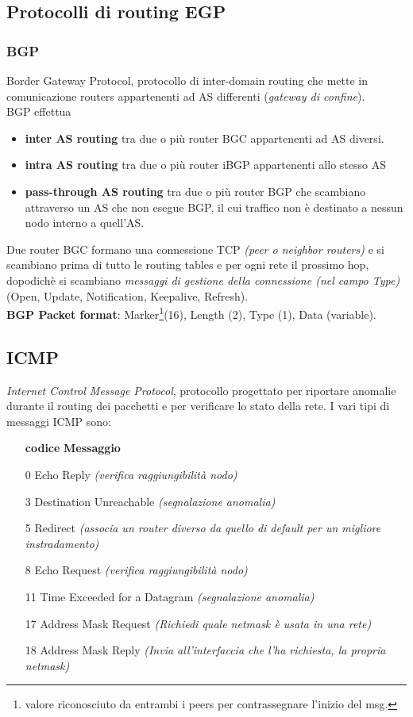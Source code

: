 \documentclass[a4paper,11pt]{article}
\begin{document}
\subsection{Protocolli di routing EGP}
\subsubsection{BGP}
Border Gateway Protocol, protocollo di inter-domain routing che mette in comunicazione routers appartenenti ad AS differenti (\textit{gateway di confine}).\\
BGP effettua 
\begin{itemize}
\item\textbf{inter AS routing} tra due o più router BGC appartenenti ad AS diversi. 
\item\textbf{intra AS routing} tra due o più router iBGP appartenenti allo stesso AS
\item\textbf{pass-through AS routing} tra due o più router BGP che scambiano attraverso un AS che non esegue BGP, il cui traffico non è destinato a nessun nodo interno a quell'AS.
\end{itemize}
Due router BGC formano una connessione TCP \textit{(peer o neighbor routers)} e si scambiano prima di tutto le routing tables e per ogni rete il prossimo hop, dopodichè si scambiano \textit{messaggi di gestione della connessione (nel campo Type)} (Open, Update, Notification, Keepalive, Refresh).\\
\textbf{BGP Packet format}: Marker\footnote{valore riconosciuto da entrambi i peers per contrassegnare l'inizio del msg.}(16), Length (2), Type (1), Data (variable).                                                                                                                  
                                                                                                                  
\subsection{ICMP}
\textit{Internet Control Message Protocol}, protocollo progettato per riportare anomalie durante il routing dei pacchetti e per verificare lo stato della rete. I vari tipi di messaggi ICMP sono:
\begin{itemize}
\item[\textbf{codice}] \textbf{Messaggio}
\item[0] Echo Reply \textit{(verifica raggiungibilità nodo)}
\item[3] Destination Unreachable \textit{(segnalazione anomalia)}
\item[5] Redirect \textit{(associa un router diverso da quello di default per un migliore instradamento)}
\item[8] Echo Request \textit{(verifica raggiungibilità nodo)}
\item[11] Time Exceeded for a Datagram \textit{(segnalazione anomalia)}
\item[17] Address Mask Request \textit{(Richiedi quale netmask è usata in una rete)}
\item[18] Address Mask Reply \textit{(Invia all'interfaccia che l'ha richiesta, la propria netmask)}
\end{itemize}
\end{document}
